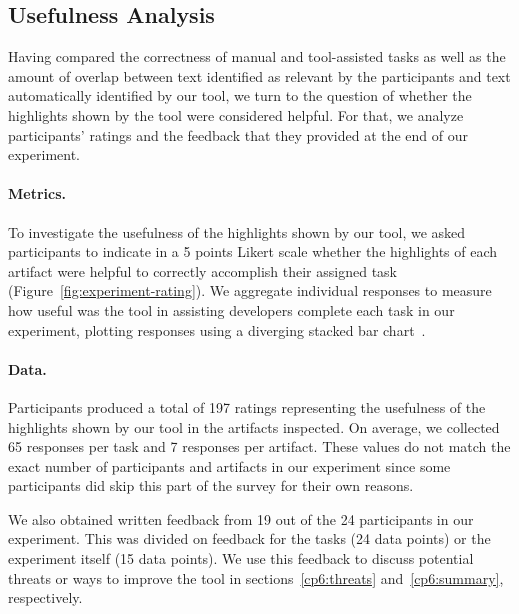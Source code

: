 

\subsection{Usefulness Analysis}
\label{cp6:usefulness}


Having compared the correctness of manual and tool-assisted tasks as well 
as the amount of overlap between text identified as relevant by the participants and 
text automatically identified by our tool, we turn to the question of 
whether the highlights shown by the tool were considered helpful. 
For that, we analyze participants' ratings and the feedback that they 
provided at the end of our experiment.







\paragraph{\textbf{Metrics.}}

To investigate the usefulness of the highlights shown by our tool, we asked participants to indicate in a 5 points Likert scale whether the highlights
of each artifact were helpful to correctly accomplish their assigned task (Figure~\ref{fig:experiment-rating}). We aggregate individual responses to measure how useful was 
the tool in assisting developers complete each task in our experiment, plotting responses using a diverging stacked bar chart~\cite{spence2001info-viz}.



\paragraph{\textbf{Data.}}


Participants produced a total of 197 ratings representing the usefulness of the highlights shown by our tool in the artifacts inspected.
On average, we collected 65 responses per task and 7 responses per artifact.  
These values do not match the exact number of participants and artifacts in our experiment since some participants did skip this part of 
the survey for their own reasons.


We also obtained written feedback from 19 out of the 24 participants in our experiment. This was divided on feedback for the tasks (24 data points)
or the experiment itself (15 data points). We use this feedback to discuss potential threats or ways to improve the tool in sections~\ref{cp6:threats} 
and~\ref{cp6:summary}, respectively.



